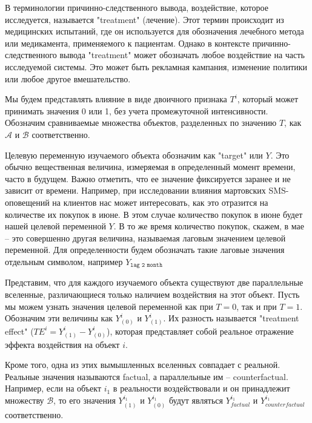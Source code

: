 \documentclass{article}
\begin{document}
        В терминологии причинно-следственного вывода, воздействие, которое исследуется, называется "treatment" (лечение).
        Этот термин происходит из медицинских испытаний, где он используется для обозначения лечебного метода или медикамента, применяемого к пациентам.
        Однако в контексте причинно-следственного вывода "treatment" может обозначать любое воздействие на часть исследуемой системы.
        Это может быть рекламная кампания, изменение политики или любое другое вмешательство.

        Мы будем представлять влияние в виде двоичного признака $T^i$, который может принимать значения 0 или 1, без учета промежуточной интенсивности.
        Обозначим сравниваемые множества объектов, разделенных по значению $T$, как $\mathcal{A}$ и $\mathcal{B}$ соответственно.

        Целевую переменную изучаемого объекта обозначим как "target" или $Y$.
        Это обычно вещественная величина, измеряемая в определенный момент времени, часто в будущем.
        Важно отметить, что ее значение фиксируется заранее и не зависит от времени.
        Например, при исследовании влияния мартовских SMS-оповещений на клиентов нас может интересовать, как это отразится на количестве их покупок в июне.
        В этом случае количество покупок в июне будет нашей целевой переменной $Y$.
        В то же время количество покупок, скажем, в мае -- это совершенно другая величина, называемая лаговым значением целевой переменной.
        Для определенности будем обозначать такие лаговые значения отдельным символом, например $Y_{\texttt{lag 2 month}}$

        Представим, что для каждого изучаемого объекта существуют две параллельные вселенные, различающиеся только наличием воздействия на этот объект.
        Пусть мы можем узнать значения целевой переменной как при $T=0$, так и при $T=1$.
        Обозначим эти величины как $Y^i_{(0)}$ и $Y^i_{(1)}$.
        Их разность называется "treatment effect" ($TE^i = Y^i_{(1)} - Y^i_{(0)}$), которая представляет собой реальное отражение эффекта воздействия на объект $i$.

        Кроме того, одна из этих вымышленных вселенных совпадает с реальной.
        Реальные значения называются factual, а параллельные им -- counterfactual.
        Например, если на объект $i_1$ в реальности воздействовали и он принадлежит множеству $\mathcal{B}$, то его значения $Y^{i_1}_{(1)}$ и $Y^{i_1}_{(0)}$ будут являться $Y^{i_1}_{factual}$ и $Y^{i_1}_{counterfactual}$ соответственно.
\end{document}
